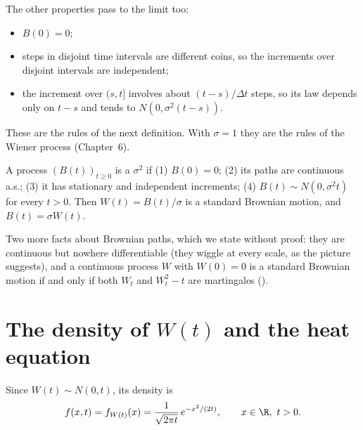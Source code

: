 The other properties pass to the limit too:
\begin{itemize}
  \item $B(0)=0$;
  \item steps in disjoint time intervals are different coins, so the increments over disjoint intervals are independent;
  \item the increment over $(s,t]$ involves about $(t-s)/\Delta t$ steps, so its law depends only on $t-s$ and tends to $N(0,\sigma^2(t-s))$.
\end{itemize}
These are the rules of the next definition. With $\sigma=1$ they are the rules of the Wiener process (Chapter~6).

\begin{definition}
\label{def:bm-sigma}
A process $(B(t))_{t\ge0}$ is a  $\sigma^2$ if (1) $B(0)=0$; (2) its paths are continuous a.s.; (3) it has stationary and independent increments; (4) $B(t)\sim N(0,\sigma^2t)$ for every $t>0$. Then $W(t)=B(t)/\sigma$ is a standard Brownian motion, and $B(t)=\sigma W(t)$.
\end{definition}

\begin{remark}
Two more facts about Brownian paths, which we state without proof: they are continuous but nowhere differentiable (they wiggle at every scale, as the picture suggests), and a continuous process $W$ with $W(0)=0$ is a standard Brownian motion if and only if both $W_t$ and $W_t^2-t$ are martingales ().
\end{remark}

\section{The density of $W(t)$ and the heat equation}

Since $W(t)\sim N(0,t)$, its density is
\[
  f(x,t)=f_{W(t)}(x)=\frac{1}{\sqrt{2\pi t}}\,e^{-x^2/(2t)},\qquad x\in\R,\ t>0 .
\]

\begin{pic}
\end{pic}

